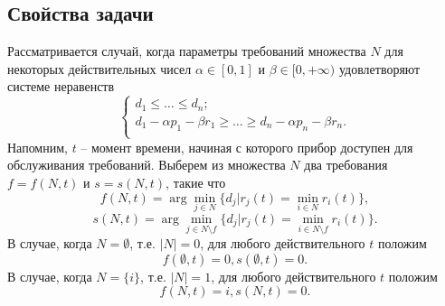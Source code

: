 \subsection{Свойства задачи}
Рассматривается случай, когда параметры требований множества $N$ для некоторых действительных чисел $\alpha \in [0, 1]$ и $\beta \in [0, +\infty)$ удовлетворяют системе неравенств
\begin{equation} \label{Lmax_ab:trivial1}
\begin{cases}
    d_1 \leq \dots \leq d_n;\\
    d_1 - \alpha p_1 - \beta r_1 \geq \dots \geq d_n - \alpha p_n - \beta r_n.\\
\end{cases}
\end{equation}
Напомним, $t$ -- момент времени, начиная с которого прибор доступен для обслуживания требований. Выберем из множества $N$ два требования $f = f(N,t)$ и $s = s(N,t)$, такие что
$$f(N,t) = \arg \min\limits_{j \in N} \{d_j | r_j(t) = \min\limits_{i \in N} r_i(t)\},$$
$$s(N,t) = \arg \min\limits_{j \in N \setminus f } \{d_j | r_j(t) = \min\limits_{i \in N \setminus f } r_i(t)\}.$$
В случае, когда $N = \emptyset$, т.е. $|N| = 0$, для любого действительного $t$ положим
$$f(\emptyset, t) = 0, s(\emptyset, t) = 0.$$
В случае, когда $N = \{i\}$, т.е. $|N| = 1$, для любого действительного $t$ положим
$$f(N, t) = i, s(N, t) = 0.$$

